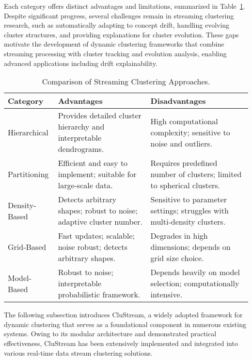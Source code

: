 Each category offers distinct advantages and limitations, summarized in
Table~\ref{table:streaming-clustering-comparison}. Despite significant
progress, several challenges remain in streaming clustering research, such as
automatically adapting to concept drift, handling evolving cluster structures,
and providing explanations for cluster evolution. These gaps motivate the
development of dynamic clustering frameworks that combine streaming processing
with cluster tracking and evolution analysis, enabling advanced applications
including drift explainability.

\begin{table}[H]
    \centering

    \begin{tabular}{|l|p{6cm}|p{6cm}|}
        \hline
        \textbf{Category} & \textbf{Advantages}                                                 & \textbf{Disadvantages}                                                  \\
        \hline
        Hierarchical      & Provides detailed cluster hierarchy and interpretable dendrograms.  & High computational complexity; sensitive to noise and outliers.         \\
        Partitioning      & Efficient and easy to implement; suitable for large-scale data.     & Requires predefined number of clusters; limited to spherical clusters.  \\
        Density-Based     & Detects arbitrary shapes; robust to noise; adaptive cluster number. & Sensitive to parameter settings; struggles with multi-density clusters. \\
        Grid-Based        & Fast updates; scalable; noise robust; detects arbitrary shapes.     & Degrades in high dimensions; depends on grid size choice.               \\
        Model-Based       & Robust to noise; interpretable probabilistic framework.             & Depends heavily on model selection; computationally intensive.          \\
        \hline
    \end{tabular}
    \caption{Comparison of Streaming Clustering Approaches.}
    \label{table:streaming-clustering-comparison}
\end{table}

The following subsection introduces CluStream, a widely adopted framework for
dynamic clustering that serves as a foundational component in numerous existing
systems. Owing to its modular architecture and demonstrated practical
effectiveness, CluStream has been extensively implemented and integrated into
various real-time data stream clustering solutions.

